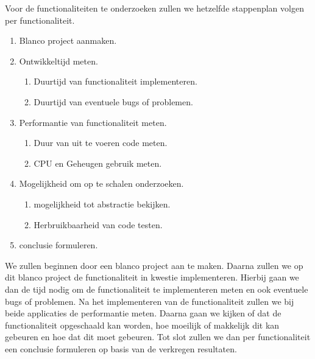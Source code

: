 Voor de functionaliteiten te onderzoeken zullen we hetzelfde stappenplan volgen per functionaliteit. 
\begin{enumerate}
    \item Blanco project aanmaken.
    \item Ontwikkeltijd meten.
    \begin{enumerate}
        \item Duurtijd van functionaliteit implementeren.
        \item Duurtijd van eventuele bugs of problemen.
    \end{enumerate}
    \item Performantie van functionaliteit meten.
    \begin{enumerate}
        \item Duur van uit te voeren code meten.
        \item CPU en Geheugen gebruik meten.
    \end{enumerate}
    \item Mogelijkheid om op te schalen onderzoeken.
    \begin{enumerate}
        \item mogelijkheid tot abstractie bekijken.
        \item Herbruikbaarheid van code testen.
    \end{enumerate}
    \item conclusie formuleren.
\end{enumerate}
We zullen beginnen door een blanco project aan te maken. Daarna zullen we op dit blanco project de 
functionaliteit in kwestie implementeren. 
Hierbij gaan we dan de tijd nodig om de functionaliteit te implementeren meten en ook eventuele bugs of problemen. 
Na het implementeren van de functionaliteit zullen we bij beide applicaties de performantie meten. 
Daarna gaan we kijken of dat de functionaliteit opgeschaald kan worden, hoe moeilijk of makkelijk dit kan gebeuren 
en hoe dat dit moet gebeuren. 
Tot slot zullen we dan per functionaliteit een conclusie formuleren op basis van de verkregen resultaten.